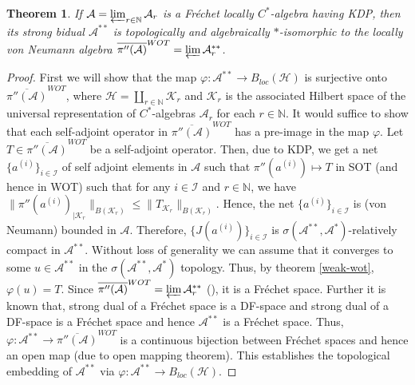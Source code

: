 \documentclass[10pt]{article}
\newtheorem{theorem}{Theorem}[section]
\theoremstyle{definition}
\begin{document}
	\begin{theorem}\label{main-new}
		If $\mathcal A=\varprojlim_{r\in \mathbb N} \mathcal A_r$ is a  Fr\'echet locally $C^*$-algebra having KDP, then its strong bidual $\mathcal A^{**}$ is topologically and algebraically $*$-isomorphic to the locally von Neumann algebra $\overline{\pi''(\mathcal A)}^{WOT}=\varprojlim\mathcal A_r^{**}$.
	\end{theorem}
\begin{proof}
	First we will show that the map $\varphi:\mathcal A^{**}\to B_{loc}(\mathcal H)$ is surjective onto $\overline{\pi''(\mathcal A)}^{WOT}$, where $\mathcal H=\coprod_{r\in \mathbb N}\mathcal K_r$ and $\mathcal K_r$ is the associated Hilbert space of the universal representation of $C^*$-algebras $\mathcal A_r$ for each $r\in \mathbb N$. It would suffice to show that each self-adjoint operator in $\overline{\pi''(\mathcal A)}^{WOT}$ has a pre-image in the map $\varphi$. Let $T\in \overline{\pi''(\mathcal A)}^{WOT}$ be a self-adjoint operator. Then, due to KDP, we get a net $\{a^{(i)}\}_{i\in \mathcal I}$ of self adjoint elements in $\mathcal A$ such that $\pi''(a^{(i)})\longmapsto T$ in SOT (and hence in WOT) such that for any $i\in \mathcal I$ and $r\in \mathbb N$, we have $\|\pi''(a^{(i)})_{|\mathcal K_r}\|_{B(\mathcal K_r)}\leq \|T_{\mathcal K_r}\|_{B(\mathcal K_r)}$. Hence, the net $\{a^{(i)}\}_{i\in \mathcal I}$ is (von Neumann) bounded in $\mathcal A$. Therefore, $\{J(a^{(i)})\}_{i\in \mathcal I}$ is $\sigma(\mathcal A^{**},\mathcal A^*)$-relatively compact in $\mathcal A^{**}$. Without loss of generality we can assume that it converges to some $u\in \mathcal A^{**}$ in the $\sigma(\mathcal A^{**},\mathcal A^*)$ topology. Thus, by theorem \ref{weak-wot}, $\varphi(u)=T$. Since $\overline{\pi''(\mathcal A)}^{WOT}= \varprojlim\mathcal A^{**}_r$ (\cite[Prop. 3.14]{Joita}), it is a Fr\'echet space. Further it is known that, strong dual of a Fr\'echet space is a DF-space and strong dual of a DF-space is a Fr\'echet space and hence $\mathcal A^{**}$ is a Fr\'echet space. Thus, $\varphi:\mathcal A^{**}\to \overline{\pi''(\mathcal A)}^{WOT}$ is a continuous bijection between Fr\'echet spaces and hence an open map (due to open mapping theorem). This establishes the topological embedding of $\mathcal A^{**}$ via  $\varphi:\mathcal A^{**}\to B_{loc}(\mathcal H)$.
	\end{proof}
\end{document}
